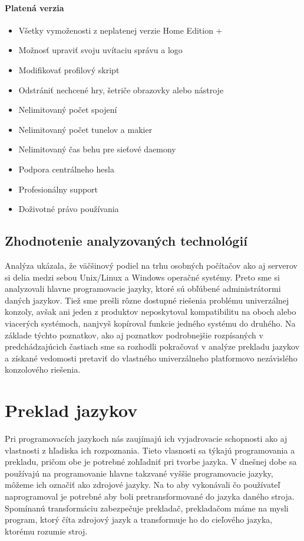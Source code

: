 \paragraph{Platená verzia}

\begin{itemize}
	\item Všetky vymoženosti z neplatenej verzie Home Edition +
	\item Možnosť upraviť svoju uvítaciu správu a logo
	\item Modifikovať profilový skript
	\item Odstrániť nechcené hry, šetriče obrazovky alebo nástroje
	\item Nelimitovaný počet spojení
	\item Nelimitovaný počet tunelov a makier
	\item Nelimitovaný čas behu pre sieťové daemony
	\item Podpora centrálneho hesla
	\item Profesionálny support
	\item Doživotné právo používania
\end{itemize}

\subsection{Zhodnotenie analyzovaných technológií}
\indent Analýza ukázala, že väčšinový podiel na trhu osobných počítačov ako aj serverov si delia medzi sebou Unix/Linux a Windows operačné systémy. Preto sme si analyzovali hlavne programovacie jazyky, ktoré sú obľúbené administrátormi daných jazykov. Tiež sme prešli rôzne dostupné riešenia problému univerzálnej konzoly, avšak ani jeden z produktov neposkytoval kompatibilitu na oboch alebo viacerých systémoch, nanjvyš kopíroval funkcie jedného systému do druhého. Na základe týchto poznatkov, ako aj poznatkov podrobnejšie rozpísaných v predchádzajúcich častiach sme sa rozhodli pokračovať v analýze prekladu jazykov a získané vedomosti pretaviť do vlastného univerzálneho platformovo nezávislého konzolového riešenia.

\section{Preklad jazykov}
\indent Pri programovacích jazykoch nás zaujímajú ich vyjadrovacie schopnosti ako aj vlastnosti z hľadiska ich rozpoznania. Tieto vlasnosti sa týkajú programovania a prekladu, pričom obe je potrebné zohľadniť pri tvorbe jazyka. V dnešnej dobe sa používajú na programovanie hlavne takzvané vyššie programovacie jazyky, môžeme ich označiť ako zdrojové jazyky. Na to aby vykonávali čo používateľ naprogramoval je potrebné aby boli pretransformované do jazyka daného stroja. Spomínanú transformáciu zabezpečuje prekladač, prekladačom máme na mysli program, ktorý číta zdrojový jazyk a transformuje ho do cieľového jazyka, ktorému rozumie stroj.\cite{gram}

